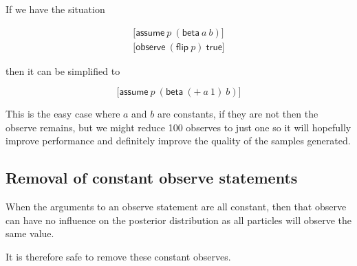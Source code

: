\documentclass[a4paper]{article}
\begin{document}
If we have the situation

\[
	\begin{array}{l}
		\lbrack \mathsf{assume}\ p\ (\mathsf{beta}\ a\ b) \rbrack \\
		\lbrack \mathsf{observe}\ (\mathsf{flip}\ p)\ \mathsf{true} \rbrack
	\end{array}
\]

then it can be simplified to

\[\lbrack \mathsf{assume}\ p\ (\mathsf{beta}\ (+\ a\ 1)\ b) \rbrack\]

This is the easy case where \(a\) and \(b\) are constants, if they are not then the observe remains, but we might reduce 100 observes to just one so it will hopefully improve performance and definitely improve the quality of the samples generated.



\subsection{Removal of constant observe statements}

When the arguments to an observe statement are all constant, then that observe can have no influence on the posterior distribution as all particles will observe the same value.

It is therefore safe to remove these constant observes.
\end{document}
